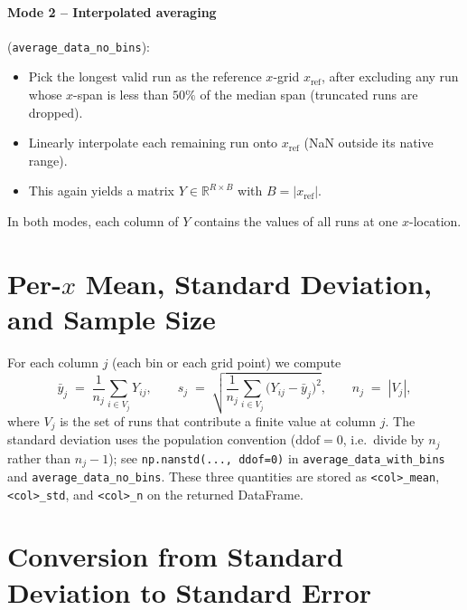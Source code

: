 \paragraph{Mode 2 -- Interpolated averaging}
(\texttt{average\_data\_no\_bins}):
\begin{itemize}
  \item Pick the longest valid run as the reference $x$-grid $x_{\text{ref}}$,
        after excluding any run whose $x$-span is less than $50\%$ of the
        median span (truncated runs are dropped).
  \item Linearly interpolate each remaining run onto $x_{\text{ref}}$
        (NaN outside its native range).
  \item This again yields a matrix $Y \in \mathbb{R}^{R \times B}$ with
        $B = |x_{\text{ref}}|$.
\end{itemize}

In both modes, each column of $Y$ contains the values of all runs at one
$x$-location.

\section{Per-$x$ Mean, Standard Deviation, and Sample Size}
\label{sec:err-perx}

For each column $j$ (each bin or each grid point) we compute
%
\begin{equation}
  \bar{y}_j \;=\; \frac{1}{n_j} \sum_{i \in V_j} Y_{ij},
  \qquad
  s_j \;=\; \sqrt{\frac{1}{n_j} \sum_{i \in V_j}
                  \bigl(Y_{ij} - \bar{y}_j\bigr)^2},
  \qquad
  n_j \;=\; |V_j|,
  \label{eq:per-x-stats}
\end{equation}
%
where $V_j$ is the set of runs that contribute a finite value at column $j$.
The standard deviation uses the population convention
($\text{ddof} = 0$, i.e.\ divide by $n_j$ rather than $n_j - 1$); see
\texttt{np.nanstd(..., ddof=0)} in \texttt{average\_data\_with\_bins} and
\texttt{average\_data\_no\_bins}. These three quantities are stored as
\verb|<col>_mean|, \verb|<col>_std|, and \verb|<col>_n| on the returned
DataFrame.

\section{Conversion from Standard Deviation to Standard Error}
\label{sec:err-sem}


